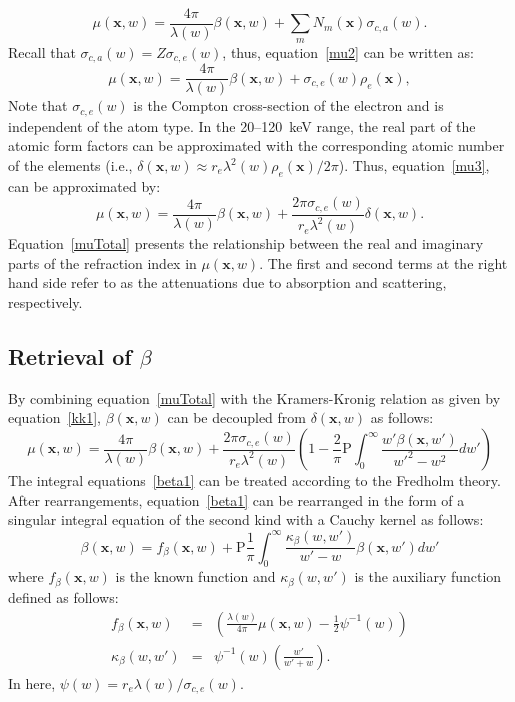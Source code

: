 \documentclass[12pt]{article}
\begin{document}
\begin{equation}
 \mu(\textbf{x},w) = \frac{4\pi}{\lambda(w)}\beta(\textbf{x},w)+\sum_m N_m(\textbf{x})\sigma_{c,a}(w).
 \label{mu2}
\end{equation}
Recall that $\sigma_{c,a}(w)=Z\sigma_{c,e}(w)$, thus, equation~\ref{mu2} can be written as:
\begin{equation}
  \mu(\textbf{x},w) = \frac{4\pi}{\lambda(w)}\beta(\textbf{x},w)+\sigma_{c,e}(w)\rho_e(\textbf{x}),
 \label{mu3}
\end{equation}
Note that $\sigma_{c,e}(w)$ is the Compton cross-section of the electron and is independent of the atom type. In the 20--120~keV range, the real part of the atomic form factors can be approximated with the corresponding atomic number of the elements (i.e., $\delta(\textbf{x},w) \approx r_e\lambda^2(w)\rho_e(\textbf{x})/2\pi$). Thus, equation~\ref{mu3}, can be approximated by:
\begin{equation}
 \mu(\textbf{x},w) = \frac{4\pi}{\lambda(w)}\beta(\textbf{x},w) +\frac{2\pi\sigma_{c,e}(w)}{r_e\lambda^2(w)}\delta(\textbf{x},w).
 \label{muTotal}
\end{equation}
Equation~\ref{muTotal} presents the relationship between the real and imaginary parts of the refraction index in $\mu(\textbf{x},w)$. The first and second terms at the right hand side refer to as the attenuations due to absorption and scattering, respectively.

\subsection{Retrieval of $\beta$}
By combining equation~\ref{muTotal} with the Kramers-Kronig relation as given by equation~\ref{kk1}, $\beta(\textbf{x},w)$ can be decoupled from $\delta(\textbf{x},w)$ as follows:
\begin{equation}
 \mu(\textbf{x},w) = \frac{4\pi}{\lambda(w)}\beta(\textbf{x},w) +\frac{2\pi\sigma_{c,e}(w)}{r_e\lambda^2(w)}\left(1-\frac{2}{\pi}\mathrm{P} \int_0^\infty\frac{w'\beta(\textbf{x},w')}{w'^2-w^2}dw'\right) \label{beta1}
\end{equation}
The integral equations~\ref{beta1} can be treated according to the Fredholm theory. After rearrangements, equation~\ref{beta1} can be rearranged in the form of a singular integral equation of the second kind with a Cauchy kernel as follows:
\begin{equation}
 \beta(\textbf{x},w) = f_\beta(\textbf{x},w) + \mathrm{P}\frac{1}{\pi}\int_0^\infty\frac{\kappa_\beta(w,w')}{w'-w}\beta(\textbf{x},w')dw'
\end{equation}
where $f_\beta(\textbf{x},w)$ is the known function and $\kappa_\beta(w,w')$ is the auxiliary function defined as follows:
\begin{eqnarray}
 f_\beta(\textbf{x},w) &=& \left(\frac{\lambda(w)}{4\pi}\mu(\textbf{x},w)-\frac{1}{2}\psi^{-1}(w)\right) \\
 \kappa_\beta(w,w') &=& \psi^{-1}(w)\left( \frac{w'}{w'+w}\right).
\end{eqnarray}
In here, $\psi(w)=r_e\lambda(w)/\sigma_{c,e}(w)$.
\end{document}
